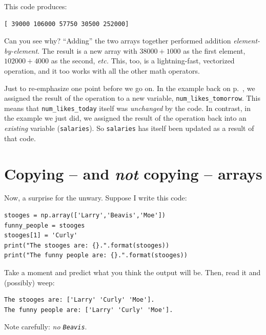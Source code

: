 This code produces:

\begin{Verbatim}[fontsize=\small,samepage=true,frame=leftline,framesep=5mm,framerule=1mm]
[ 39000 106000 57750 30500 252000]
\end{Verbatim}

Can you see why? ``Adding'' the two arrays together performed addition
\textit{element-by-element}. The result is a new array with $38000+1000$ as the
first element, $102000+4000$ as the second, \textit{etc.} This, too, is a
lightning-fast, vectorized operation, and it too works with all the other math
operators.

Just to re-emphasize one point before we go on. In the example back on
p.~\pageref{vectorizedArrayIntExample}, we assigned the result of the operation
to a new variable, \texttt{num\_likes\_tomorrow}. This means that
\texttt{num\_likes\_today} itself was \textit{unchanged} by the code. In
contrast, in the example we just did, we assigned the result of the operation
back into an \textit{existing} variable (\texttt{salaries}). So
\texttt{salaries} has itself been updated as a result of that code.



\section{Copying -- and \textit{not} copying -- arrays}

Now, a surprise for the unwary. Suppose I write this code:

\label{code:refNotCopy}
\begin{Verbatim}[fontsize=\small,samepage=true,frame=single,framesep=3mm]
stooges = np.array(['Larry','Beavis','Moe'])
funny_people = stooges
stooges[1] = 'Curly'
print("The stooges are: {}.".format(stooges))
print("The funny people are: {}.".format(stooges))
\end{Verbatim}

Take a moment and predict what you think the output will be. Then, read it and
(possibly) weep:

\begin{Verbatim}[fontsize=\small,samepage=true,frame=leftline,framesep=5mm,framerule=1mm]
The stooges are: ['Larry' 'Curly' 'Moe'].
The funny people are: ['Larry' 'Curly' 'Moe'].
\end{Verbatim}

Note carefully: \textit{no \texttt{Beavis}}.

